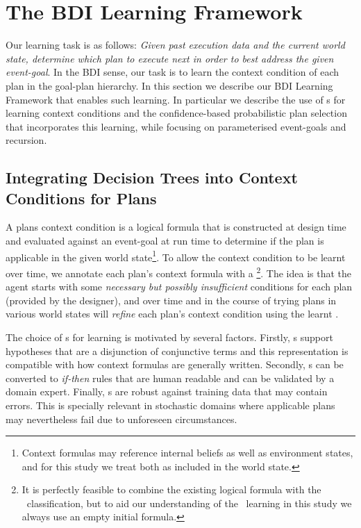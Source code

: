 \section{The BDI Learning Framework}\label{sec:framework}

Our learning task is as follows: \textit{Given past execution data and the current world state, determine which plan to execute next in order to best address the given event-goal}. In the BDI sense, our task is to learn the context condition of each plan in the goal-plan hierarchy. In this section we describe our BDI Learning Framework that enables such learning. In particular we describe the use of \dt s for learning context conditions and the confidence-based probabilistic plan selection that incorporates this learning, while focusing on parameterised event-goals and recursion.

\subsection{Integrating Decision Trees into Context Conditions for Plans}
\label{sec:decision_trees}

A plans context condition is a logical formula that is constructed at design time and evaluated against an event-goal at run time to determine if the plan is applicable in the given world state\footnote{Context formulas may reference internal beliefs as well as environment states, and for this study we treat both as included in the world state.}. To allow the context condition to be learnt over time, we annotate each plan's context formula with a \textit{\dt}\footnote{It is perfectly feasible to combine the existing logical formula with the \dt\ classification, but to aid our understanding of the \dt\ learning in this study we always use an empty initial formula.}\cite{Airiau:IJAT:09}. The idea is that the agent starts with some \textit{necessary but possibly insufficient} conditions for each plan (provided by the designer), and over time and in the course of trying plans in various world states will \textit{refine} each plan's context condition using the learnt \dt.
 
The choice of \dt s for learning is motivated by several factors. Firstly, \dt s support hypotheses that are a disjunction of conjunctive terms and this representation is compatible with how context formulas are generally written. Secondly, \dt s can be converted to \textit{if-then} rules that are human readable and can be validated by a domain expert. Finally, \dt s are robust against training data that may contain errors. This is specially relevant in stochastic domains where applicable plans may nevertheless fail due to unforeseen circumstances.

